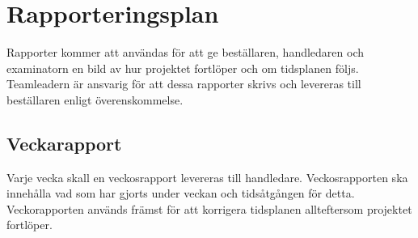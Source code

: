 \section{Rapporteringsplan}
Rapporter kommer att användas för att ge beställaren, handledaren och examinatorn en bild av hur projektet fortlöper och om tidsplanen följs. Teamleadern är ansvarig för att dessa rapporter skrivs och levereras till beställaren enligt överenskommelse.

\subsection{Veckarapport}
Varje vecka skall en veckosrapport levereras till handledare. Veckosrapporten ska innehålla vad som har gjorts under veckan och tidsåtgången för detta. Veckorapporten används främst för att korrigera tidsplanen allteftersom projektet fortlöper.
